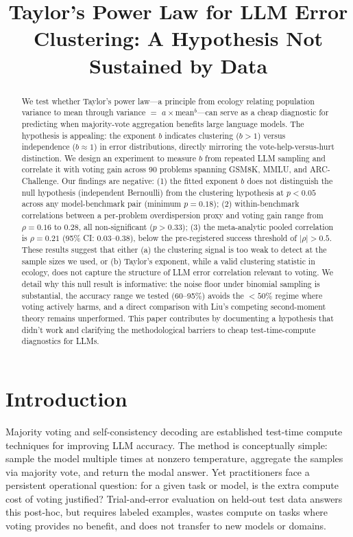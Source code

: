 \documentclass[11pt,letterpaper]{article}
\title{Taylor's Power Law for LLM Error Clustering: A Hypothesis Not Sustained by Data}
\author{}
\date{}
\begin{document}
\maketitle

\begin{abstract}
We test whether Taylor's power law---a principle from ecology relating population variance to mean through variance $=$ $a \times \text{mean}^b$---can serve as a cheap diagnostic for predicting when majority-vote aggregation benefits large language models. The hypothesis is appealing: the exponent $b$ indicates clustering ($b > 1$) versus independence ($b \approx 1$) in error distributions, directly mirroring the vote-help-versus-hurt distinction. We design an experiment to measure $b$ from repeated LLM sampling and correlate it with voting gain across 90 problems spanning GSM8K, MMLU, and ARC-Challenge. Our findings are negative: (1) the fitted exponent $b$ does not distinguish the null hypothesis (independent Bernoulli) from the clustering hypothesis at $p < 0.05$ across any model-benchmark pair (minimum $p = 0.18$); (2) within-benchmark correlations between a per-problem overdispersion proxy and voting gain range from $\rho = 0.16$ to $0.28$, all non-significant ($p > 0.33$); (3) the meta-analytic pooled correlation is $\rho = 0.21$ (95\% CI: 0.03--0.38), below the pre-registered success threshold of $|\rho| > 0.5$. These results suggest that either (a) the clustering signal is too weak to detect at the sample sizes we used, or (b) Taylor's exponent, while a valid clustering statistic in ecology, does not capture the structure of LLM error correlation relevant to voting. We detail why this null result is informative: the noise floor under binomial sampling is substantial, the accuracy range we tested (60--95\%) avoids the $<50\%$ regime where voting actively harms, and a direct comparison with Liu's competing second-moment theory remains unperformed. This paper contributes by documenting a hypothesis that didn't work and clarifying the methodological barriers to cheap test-time-compute diagnostics for LLMs.
\end{abstract}

\section{Introduction}

Majority voting and self-consistency decoding are established test-time compute techniques for improving LLM accuracy. The method is conceptually simple: sample the model multiple times at nonzero temperature, aggregate the samples via majority vote, and return the modal answer. Yet practitioners face a persistent operational question: for a given task or model, is the extra compute cost of voting justified? Trial-and-error evaluation on held-out test data answers this post-hoc, but requires labeled examples, wastes compute on tasks where voting provides no benefit, and does not transfer to new models or domains.
\end{document}
